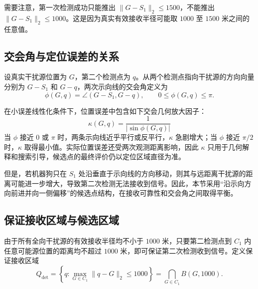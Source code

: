 需要注意，第一次检测成功只能推出 $\|G-S_1\|_2\leq1500$，不能推出 $\|G-S_1\|_2\leq1000$。这是因为真实有效接收半径可能取 $1000$ 至 $1500$ 米之间的任意值。

\subsection{交会角与定位误差的关系}

设真实干扰源位置为 $G$，第二个检测点为 $q$。从两个检测点指向干扰源的方向向量分别为 $G-S_1$ 和 $G-q$，两次示向线的交会角定义为
\begin{equation}
  \phi(G,q)=\angle(G-S_1,G-q),
  \qquad 0\leq\phi(G,q)\leq\pi.
  \label{eq:q2-cross-angle}
\end{equation}

在小误差线性化条件下，位置误差中包含如下交会几何放大因子：
\begin{equation}
  \kappa(G,q)=\frac{1}{|\sin\phi(G,q)|}
  \label{eq:q2-amplification}
\end{equation}
当 $\phi$ 接近 $0$ 或 $\pi$ 时，两条示向线近乎平行或反平行，$\kappa$ 急剧增大；当 $\phi$ 接近 $\pi/2$ 时，$\kappa$ 取得最小值。实际位置误差还受两次观测距离影响，因此 $\kappa$ 只用于几何解释和搜索引导，候选点的最终评价仍以定位区域直径为准。

但是，若机器狗只在 $S_1$ 处沿垂直于示向线的方向移动，则其与远距离干扰源的距离可能进一步增大，导致第二次检测无法接收到信号。因此，本节采用“沿示向方向前进并向一侧偏移”的候选点结构，在接收可靠性和交会角之间取得平衡。

\subsection{保证接收区域与候选区域}

由于所有全向干扰源的有效接收半径均不小于 $1000$ 米，只要第二检测点到 $C_1$ 内任意可能源位置的距离均不超过 $1000$ 米，即可保证第二次检测收到信号。定义保证接收区域
\begin{equation}
  Q_{\mathrm{det}}
  =\left\{
  q:\max_{G\in C_1}\|q-G\|_2\leq1000
  \right\}
  =\bigcap_{G\in C_1}B(G,1000).
  \label{eq:q2-detection-region}
\end{equation}

